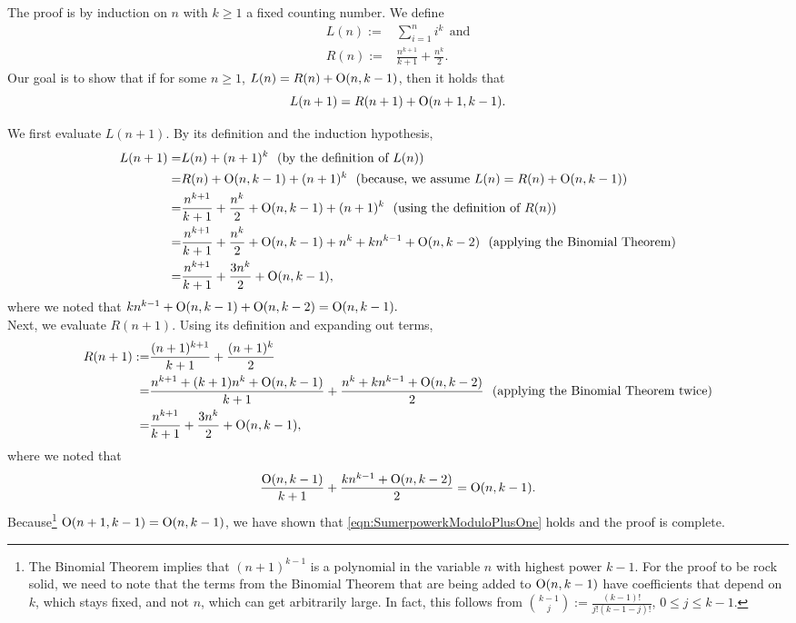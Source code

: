 \bigskip

The proof is by induction on $n$ with $k\ge 1$ a fixed counting number. We define 
  \begin{equation}
      \label{eqn:PowerSumFormulaTerms}
      \begin{aligned}
          L(n):= &  \sum_{i=1}^{n}i^k ~~\text{and}\\
          R(n):= & \frac{n^{k+1}}{k+1} + \frac{n^k}{2}. 
      \end{aligned}
  \end{equation}
  Our goal is to show that if for some $n\ge 1$, $L(n) = R(n) + \mathrm{O}(n,k-1)$, then it holds that 
  \begin{equation}
      \label{eqn:SumerpowerkModuloPlusOne}
      L(n+1) = R(n+1) + \mathrm{O}(n+1,k-1). 
  \end{equation}

We first evaluate $L(n+1)$. By its definition and the induction hypothesis,
\begin{align*}
    L(n+1)=& L(n) + (n+1)^k ~~(\text{by the definition of } L(n) )\\
    = & R(n) + \mathrm{O}(n,k-1) + (n+1)^k ~~(\text{because, we assume } L(n) = R(n) + \mathrm{O}(n,k-1))\\
    = & \frac{n^{k+1}}{k+1} + \frac{n^k}{2} + \mathrm{O}(n,k-1) + (n+1)^k ~~(\text{using the definition of } R(n)) \\
 = & \frac{n^{k+1}}{k+1} + \frac{n^k}{2} + \mathrm{O}(n,k-1) + n^k + k n^{k-1} + \mathrm{O}(n,k-2)  ~~(\text{applying the Binomial Theorem})\\
 = &\frac{n^{k+1}}{k+1} + \frac{3n^k}{2} + \mathrm{O}(n,k-1),
\end{align*} 
where we noted that $k n^{k-1} + \mathrm{O}(n,k-1) + \mathrm{O}(n,k-2) =  \mathrm{O}(n,k-1).$\\

Next, we evaluate $R(n+1)$. Using its definition and expanding out terms, 
\begin{align*}
   R(n+1):= & \frac{(n+1)^{k+1}}{k+1} + \frac{(n+1)^k}{2} \\
    = & \frac{n^{k+1} + (k+1)n^k + \mathrm{O}(n, k-1)}{k+1} + \frac{n^k + k n^{k-1} + \mathrm{O}(n,k-2)}{2} ~~(\text{applying the Binomial Theorem twice})\\
    = &\frac{n^{k+1}}{k+1} + \frac{3n^k}{2} + \mathrm{O}(n,k-1),\\
\end{align*}
where we noted that 
$$\frac{\mathrm{O}(n, k-1)}{k+1} + \frac{k n^{k-1} + \mathrm{O}(n,k-2)}{2} =  \mathrm{O}(n,k-1).$$
Because\footnote{The Binomial Theorem implies that $(n+1)^{k-1}$ is a polynomial in the variable $n$ with highest power $k-1$. For the proof to be rock solid, we need to note that the terms from the Binomial Theorem that are being added to $\mathrm{O}(n,k-1)$ have coefficients that depend on $k$, which stays fixed, and not $n$, which can get arbitrarily large. In fact, this follows from $\binom{k-1}{j} := \frac{(k-1)!}{j!(k-1-j)!}$, $0 \le j \le k-1$.} $\mathrm{O}(n+1,k-1)=\mathrm{O}(n,k-1)$, we have shown that \eqref{eqn:SumerpowerkModuloPlusOne} holds and the proof is complete.
\Qed

